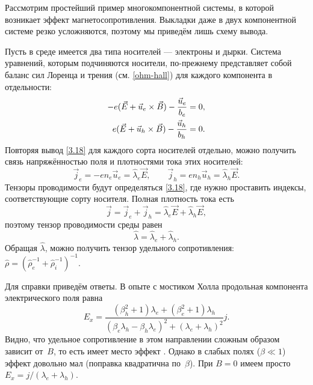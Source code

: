 \begin{lab:example}
Рассмотрим простейший пример многокомпонентной системы, в которой возникает
эффект магнетосопротивления. Выкладки даже в двух компонентной
системе резко усложняются, поэтому мы приведём лишь схему вывода.

Пусть в среде имеется два типа носителей --- электроны и дырки. Система
уравнений, которым подчиняются носители, по-прежнему представляет собой баланс
сил Лоренца и трения (см. \eqref{ohm-hall}) для каждого компонента в
отдельности:
\begin{equation}
    \eqmark{two-component}
    \begin{aligned}
-e(\vec{E}+\vec{u}_e\times \vec{B}) - \frac{\vec{u}_e}{b_e} &=0,\\
e(\vec{E}+\vec{u}_h\times \vec{B}) - \frac{\vec{u}_h}{b_h} &=0.
\end{aligned}
\end{equation}
Повторяя вывод \eqref{3.18} для каждого сорта носителей отдельно, можно
получить связь напряжённостью поля и плотностями тока этих носителей:
\begin{equation}
    \vec{j}_e = -en_e \vec{u}_e = \hat{\lambda}_e \vec{E},\qquad
    \vec{j}_h = en_h \vec{u}_h = \hat{\lambda}_h \vec{E}.
\end{equation}
Тензоры проводимости будут определяться \eqref{3.18}, где нужно проставить
индексы, соответствующие сорту носителя.
Полная плотность тока есть
\[
\vec{j} = \vec{j}_e + \vec{j}_h = \hat{\lambda}_e \vec{E} +
\hat{\lambda}_h \vec{E},
\]
поэтому тензор проводимости среды равен
\[
\hat{\lambda} = \hat{\lambda}_e + \hat{\lambda}_h.
\]
Обращая $\hat{\lambda}$, можно получить тензор удельного сопротивления:
$\hat{\rho}=
\left(\hat{\rho}_e^{-1}+\hat{\rho}_i^{-1}\right)^{-1}$.

Для справки приведём ответы.
В опыте с мостиком Холла продольная компонента электрического поля равна
\[
E_x = \frac{(\beta_h^2+1) \lambda_e+ (\beta_e^2 +1)\lambda_h}%
{ (\beta_e \lambda_h-\beta_h \lambda_e)^2 + (\lambda_e+\lambda_h)^2}
j.
\]
Видно, что удельное сопротивление в этом направлении сложным образом
зависит от~$B$, то есть имеет место эффект .
Однако в слабых полях ($\beta \ll 1$) эффект довольно мал (поправка
квадратична по~$\beta$). При $B=0$ имеем просто
$E_x = j/(\lambda_e+\lambda_h)$.


\end{lab:example}
